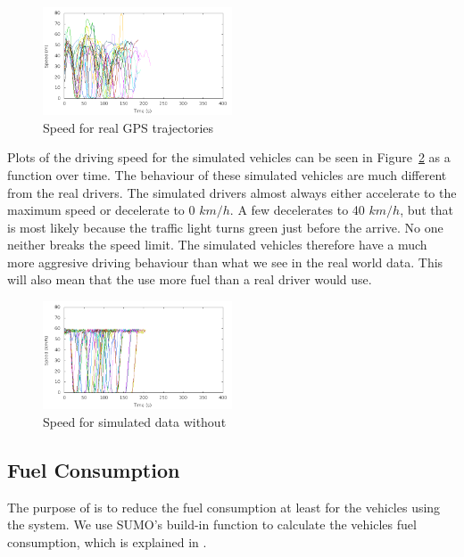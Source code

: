 \begin{figure}[htb]
\includegraphics[width=0.5\textwidth]{../images/Real/RealSpeed.png}
\caption{Speed for real GPS trajectories}
\label{fig:TestResults:RealSpeed}
\end{figure}

Plots of the driving speed for the simulated vehicles can be seen in Figure~\ref{fig:TestResults:speed0} as a function over time.
The behaviour of these simulated vehicles are much different from the real drivers.
The simulated drivers almost always either accelerate to the maximum speed or decelerate to 0 $km/h$. 
A few decelerates to 40 $km/h$, but that is most likely because the traffic light turns green just before the arrive.
No one neither breaks the speed limit.
The simulated vehicles therefore have a much more aggresive driving behaviour than what we see in the real world data.
This will also mean that the use more fuel than a real driver would use.

\begin{figure}[htb]
\includegraphics[width=0.5\textwidth]{../images/tp0c1_0/speedUncontrolled0.png}
\caption{Speed for simulated data without \tech}
\label{fig:TestResults:speed0}
\end{figure}

\subsection{Fuel Consumption}
The purpose of \tech is to reduce the fuel consumption at least for the vehicles using the system. 
We use SUMO's build-in function to calculate the vehicles fuel consumption, which is explained in \cite{SUMOFuel}.

